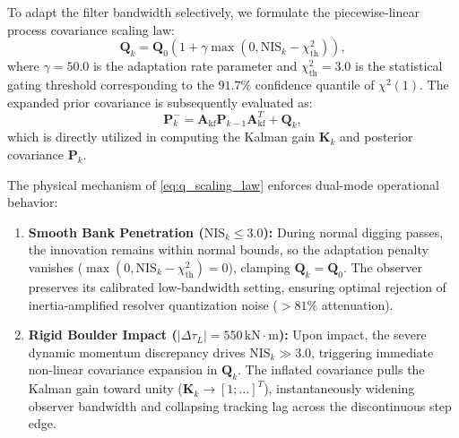 \documentclass[journal]{IEEEtran}
\begin{document}
To adapt the filter bandwidth selectively, we formulate the piecewise-linear process covariance scaling law:
\begin{equation}
\bm{Q}_k = \bm{Q}_0 \left(1 + \gamma \max\left(0, \mathrm{NIS}_k - \chi^2_{\mathrm{th}}\right)\right),
\label{eq:q_scaling_law}
\end{equation}
where $\gamma = 50.0$ is the adaptation rate parameter and $\chi^2_{\mathrm{th}} = 3.0$ is the statistical gating threshold corresponding to the $91.7\%$ confidence quantile of $\chi^2(1)$. The expanded prior covariance is subsequently evaluated as:
\begin{equation}
\bm{P}^-_k = \bm{A}_{\mathrm{kf}}\bm{P}_{k-1}\bm{A}_{\mathrm{kf}}^T + \bm{Q}_k,
\end{equation}
which is directly utilized in computing the Kalman gain $\bm{K}_k$ and posterior covariance $\bm{P}_k$.

The physical mechanism of \eqref{eq:q_scaling_law} enforces dual-mode operational behavior:
\begin{enumerate}
    \item \textbf{Smooth Bank Penetration ($\mathrm{NIS}_k \le 3.0$):} During normal digging passes, the innovation remains within normal bounds, so the adaptation penalty vanishes ($\max(0, \mathrm{NIS}_k - \chi^2_{\mathrm{th}}) = 0$), clamping $\bm{Q}_k = \bm{Q}_0$. The observer preserves its calibrated low-bandwidth setting, ensuring optimal rejection of inertia-amplified resolver quantization noise ($>81\%$ attenuation).
    \item \textbf{Rigid Boulder Impact ($|\Delta \tau_L| = 550\,\mathrm{kN\cdot m}$):} Upon impact, the severe dynamic momentum discrepancy drives $\mathrm{NIS}_k \gg 3.0$, triggering immediate non-linear covariance expansion in $\bm{Q}_k$. The inflated covariance pulls the Kalman gain toward unity ($\bm{K}_k \to [1; \dots]^T$), instantaneously widening observer bandwidth and collapsing tracking lag across the discontinuous step edge.
\end{enumerate}
\end{document}
